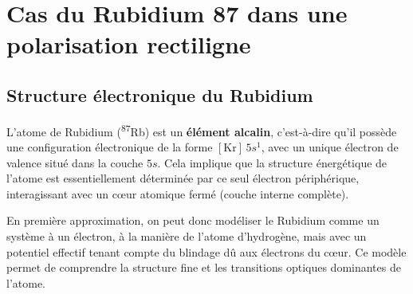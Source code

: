 %
%

\section{Cas du Rubidium 87 dans une polarisation rectiligne}

\subsection{Structure électronique du Rubidium}

L’atome de Rubidium (\textsuperscript{87}Rb) est un \textbf{élément alcalin}, c’est-à-dire qu’il possède une configuration électronique de la forme $[ \mathrm{Kr} ]\,5s^1$, avec un unique électron de valence situé dans la couche $5s$. Cela implique que la structure énergétique de l’atome est essentiellement déterminée par ce seul électron périphérique, interagissant avec un cœur atomique fermé (couche interne complète).

En première approximation, on peut donc modéliser le Rubidium comme un système à un électron, à la manière de l’atome d’hydrogène, mais avec un potentiel effectif tenant compte du blindage dû aux électrons du cœur. Ce modèle permet de comprendre la structure fine et les transitions optiques dominantes de l’atome.

